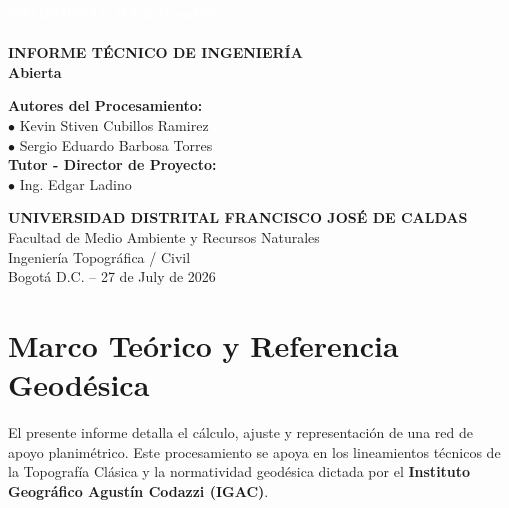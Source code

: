 \documentclass[11pt,letterpaper]{article}
\begin{document}
\begin{titlepage}
\vspace*{-2cm}
\begin{center}
  \textcolor{white}{\Huge \textbf{GEOPORTAL WEB (GeoPol)}} \\[0.5cm]
  \textcolor{white}{\large \textit{''Máxima precisión al alcance de tus manos''}} \\[2cm]
  \vspace{3cm}
  {\LARGE \textbf{INFORME TÉCNICO DE INGENIERÍA}} \\[0.5cm]
  {\Large \textbf{Abierta}} \\[2cm]
  \begin{flushleft}
    \Large \textbf{Autores del Procesamiento:}\\[0.2cm]
    \large $\bullet$ Kevin Stiven Cubillos Ramirez \\[0.1cm]
    \large $\bullet$ Sergio Eduardo Barbosa Torres \\[0.1cm]
    \vspace{1cm}
    \Large \textbf{Tutor - Director de Proyecto:}\\[0.2cm]
    \large $\bullet$ Ing. Edgar Ladino
  \end{flushleft}
  \vfill
  \textbf{UNIVERSIDAD DISTRITAL FRANCISCO JOSÉ DE CALDAS}\\[0.2cm]
  Facultad de Medio Ambiente y Recursos Naturales \\ Ingeniería Topográfica / Civil \\[0.2cm]
  Bogotá D.C. -- 27 de July de 2026
\end{center}
\end{titlepage}
\tableofcontents
\newpage
\section{Marco Teórico y Referencia Geodésica}
El presente informe detalla el cálculo, ajuste y representación de una red de apoyo planimétrico. Este procesamiento se apoya en los lineamientos técnicos de la Topografía Clásica y la normatividad geodésica dictada por el \textbf{Instituto Geográfico Agustín Codazzi (IGAC)}.
\end{document}
